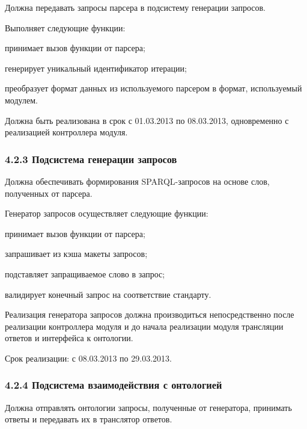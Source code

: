 Должна передавать запросы парсера в подсистему генерации запросов.

Выполняет следующие функции:
\begin{list}{}{\leftmargin=1.5cm}
  \item принимает вызов функции от парсера;
  \item генерирует уникальный идентификатор итерации;
  \item преобразует формат данных из используемого парсером в формат, используемый модулем.
\end{list}

Должна быть реализована в срок с 01.03.2013 по 08.03.2013, одновременно с реализацией контроллера модуля.

\subsubsection*{4.2.3 Подсистема генерации запросов}

Должна обеспечивать формирования SPARQL-запросов на основе слов, полученных от парсера.

Генератор запросов осуществляет следующие функции:
\begin{list}{}{\leftmargin=1.5cm}
  \item принимает вызов функции от парсера;
  \item запрашивает из кэша макеты запросов;
  \item подставляет запращиваемое слово в запрос;
  \item валидирует конечный запрос на соответствие стандарту.
\end{list}

Реализация генератора запросов должна производиться непосредственно после реализации контроллера модуля и до начала реализации модуля трансляции ответов и интерфейса к онтологии.

Срок реализации: с 08.03.2013 по 29.03.2013.

\subsubsection*{4.2.4 Подсистема взаимодействия с онтологией}

Должна отправлять онтологии запросы, полученные от генератора, принимать ответы и передавать их в транслятор ответов.

